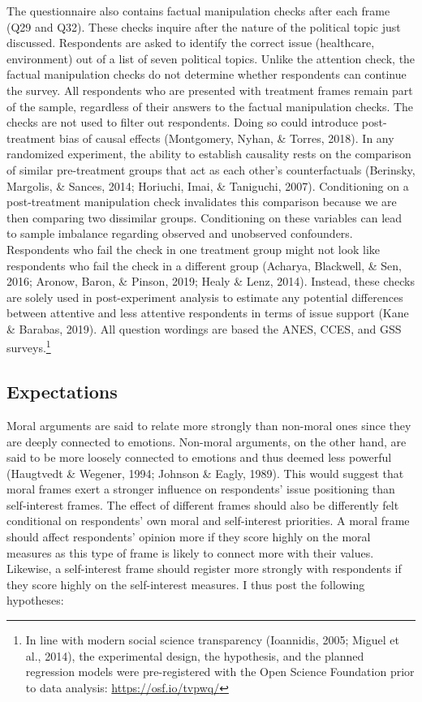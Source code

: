 \documentclass[12pt,econ]{sources/authesis}
\begin{document}
The questionnaire also contains factual manipulation checks after each frame (Q29 and Q32). These checks inquire after the nature of the political topic just discussed. Respondents are asked to identify the correct issue (healthcare, environment) out of a list of seven political topics. Unlike the attention check, the factual manipulation checks do not determine whether respondents can continue the survey. All respondents who are presented with treatment frames remain part of the sample, regardless of their answers to the factual manipulation checks. The checks are not used to filter out respondents. Doing so could introduce post-treatment bias of causal effects (Montgomery, Nyhan, \& Torres, 2018). In any randomized experiment, the ability to establish causality rests on the comparison of similar pre-treatment groups that act as each other's counterfactuals (Berinsky, Margolis, \& Sances, 2014; Horiuchi, Imai, \& Taniguchi, 2007). Conditioning on a post-treatment manipulation check invalidates this comparison because we are then comparing two dissimilar groups. Conditioning on these variables can lead to sample imbalance regarding observed and unobserved confounders. Respondents who fail the check in one treatment group might not look like respondents who fail the check in a different group (Acharya, Blackwell, \& Sen, 2016; Aronow, Baron, \& Pinson, 2019; Healy \& Lenz, 2014). Instead, these checks are solely used in post-experiment analysis to estimate any potential differences between attentive and less attentive respondents in terms of issue support (Kane \& Barabas, 2019). All question wordings are based the ANES, CCES, and GSS surveys.\footnote{In line with modern social science transparency (Ioannidis, 2005; Miguel et al., 2014), the experimental design, the hypothesis, and the planned regression models were pre-registered with the Open Science Foundation prior to data analysis: \url{https://osf.io/tvpwq/}}

\hypertarget{framing-design-expectations}{%
\subsection{Expectations}\label{framing-design-expectations}}

Moral arguments are said to relate more strongly than non-moral ones since they are deeply connected to emotions. Non-moral arguments, on the other hand, are said to be more loosely connected to emotions and thus deemed less powerful (Haugtvedt \& Wegener, 1994; Johnson \& Eagly, 1989). This would suggest that moral frames exert a stronger influence on respondents' issue positioning than self-interest frames. The effect of different frames should also be differently felt conditional on respondents' own moral and self-interest priorities. A moral frame should affect respondents' opinion more if they score highly on the moral measures as this type of frame is likely to connect more with their values. Likewise, a self-interest frame should register more strongly with respondents if they score highly on the self-interest measures. I thus post the following hypotheses:
\end{document}
